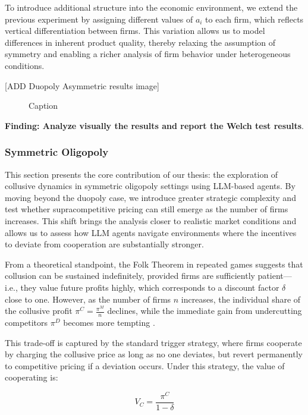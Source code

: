 To introduce additional structure into the economic environment, we extend the previous experiment by assigning different values of $a_i$ to each firm, which reflects vertical differentiation between firms. This variation allows us to model differences in inherent product quality, thereby relaxing the assumption of symmetry and enabling a richer analysis of firm behavior under heterogeneous conditions.


[ADD Duopoly Asymmetric results image]
\begin{figure}[H]
    \centering
    \caption{Caption}
    \label{fig:enter-label}
\end{figure}
\textbf{Finding: Analyze visually the results and report the Welch test results}.



\subsubsection*{Symmetric Oligopoly}

This section presents the core contribution of our thesis: the exploration of collusive dynamics in symmetric oligopoly settings using LLM-based agents. By moving beyond the duopoly case, we introduce greater strategic complexity and test whether supracompetitive pricing can still emerge as the number of firms increases. This shift brings the analysis closer to realistic market conditions and allows us to assess how LLM agents navigate environments where the incentives to deviate from cooperation are substantially stronger.

From a theoretical standpoint, the Folk Theorem in repeated games suggests that collusion can be sustained indefinitely, provided firms are sufficiently patient—i.e., they value future profits highly, which corresponds to a discount factor $\delta$ close to one. However, as the number of firms $n$ increases, the individual share of the collusive profit $\pi^C = \frac{\pi^M}{n}$ declines, while the immediate gain from undercutting competitors $\pi^D$ becomes more tempting \parencite{ivaldi_chapter_2007, tirole_theory_1988}.

This trade-off is captured by the standard trigger strategy, where firms cooperate by charging the collusive price as long as no one deviates, but revert permanently to competitive pricing if a deviation occurs. Under this strategy, the value of cooperating is:

$$V_C = \frac{\pi^C}{1 - \delta}$$

